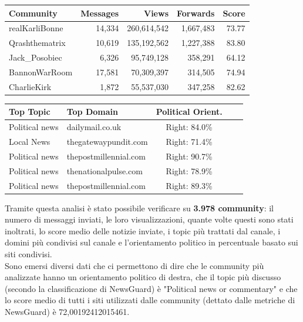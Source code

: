 \documentclass[12pt]{article}
\begin{document}
	\begin{table}[h!]
		\centering
		\small
		\begin{tabular}{|l|r|r|r|r|}
			\hline
			\rowcolor{darkblue}
			\color{white}Community & 
			\color{white}Messages & 
			\color{white}Views & 
			\color{white}Forwards & 
			\color{white}Score \\ 
			\hline
			realKarliBonne & 
			14,334 & 
			260,614,542 & 
			1,667,483 & 
			73.77 \\ 
			\hline
			Qrashthematrix & 
			10,619 & 
			135,192,562 & 
			1,227,388 & 
			83.80 \\ 
			\hline
			Jack\_Posobiec & 
			6,326 & 
			95,749,128 & 
			358,291 & 
			64.12 \\ 
			\hline
			BannonWarRoom & 
			17,581 & 
			70,309,397 & 
			314,505 & 
			74.94 \\ 
			\hline
			CharlieKirk & 
			1,872 & 
			55,537,030 & 
			347,258 & 
			82.62 \\ 
			\hline
		\end{tabular}
		
		\vspace{0.5cm}
		
		\begin{tabular}{|l|l|c|l|c|}
			\hline
			\rowcolor{darkblue}
			\color{white}Top Topic & 
			\color{white}Top Domain & 
			\color{white}Political Orient. \\ 
			\hline
			Political news & 
			dailymail.co.uk & 
			Right: 84.0\%
			\\ 
			\hline
			Local News & 
			thegatewaypundit.com & 
			Right: 71.4\%
			\\ 
			\hline
			Political news & 
			thepostmillennial.com & 
			Right: 90.7\%
			\\ 
			\hline
			Political news & 
			thenationalpulse.com & 
			Right: 78.9\%
			\\ 
			\hline
			Political news & 
			thepostmillennial.com & 
			Right: 89.3\%
			\\ 
			\hline
		\end{tabular}
	\end{table}
	Tramite questa analisi è stato possibile verificare su \textbf{3.978 community}: il numero di messaggi inviati, le loro visualizzazioni, quante volte questi sono stati inoltrati, lo score medio delle notizie inviate, i topic più trattati dal canale, i domini più condivisi sul canale e l'orientamento politico in percentuale basato sui siti condivisi.\\
	Sono emersi diversi dati che ci permettono di dire che le community più analizzate hanno un orientamento politico di destra, che il topic più discusso (secondo la classificazione di NewsGuard) è "Political news or commentary" e che lo score medio di tutti i siti utilizzati dalle community (dettato dalle metriche di NewsGuard) è 72,00192412015461.
	\newpage
\end{document}
